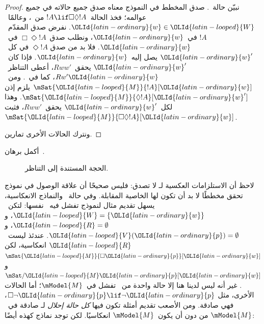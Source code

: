 \documentclass[../../../include/open-logic-section]{subfiles}
\begin{document}
\begin{proof}
  نبيّن حالة~. صدق المخطط في النموذج معناه صدق جميع
  حالاته في جميع عوالمه؛ فخذ الحالة~$!A \lif \Box\Diamond !A$
  من~، وعالمًا~${\OLId{latin-ordinary}{w}} \in {\OLId{latin-looped}{W}}$. نفرض صدق المقدّم~$!A$ في~${\OLId{latin-ordinary}{w}}$،
  ونطلب صدق~$\Box \Diamond !A$ في~${\OLId{latin-ordinary}{w}}$. فلا بد من صدق
  $\Diamond !A$ في كل~${\OLId{latin-ordinary}{w}}'$ يصل إليه~${\OLId{latin-ordinary}{w}}$.
  فإذا كان~${\OLId{latin-ordinary}{w}}'$ يحقق~$Rww'$، أعطى التناظر~$Rw'{\OLId{latin-ordinary}{w}}$، كما
  في~. ومن~$\mSat{{\OLId{latin-looped}{M}}}{!A}[{\OLId{latin-ordinary}{w}}]$ يلزم إذن
  $\mSat{{\OLId{latin-looped}{M}}}{\Diamond !A}[{\OLId{latin-ordinary}{w}}']$. وهذا لكل~${\OLId{latin-ordinary}{w}}'$ يحقق~$Rww'$،
  فثبت~$\mSat{{\OLId{latin-looped}{M}}}{\Box\Diamond!A}[{\OLId{latin-ordinary}{w}}]$.

  ونترك الحالات الأخرى تمارين.
\end{proof}

\begin{prob}
  أكمل برهان~.
\end{prob}

\begin{figure}
  \begin{center}
  \end{center}
\caption{الحجة المستندة إلى التناظر.}
\end{figure}

لاحظ أن الاستلزامات العكسية لـ لا تصدق: فليس
صحيحًا أن علاقة الوصول في نموذج تحقق مخططًا لا بد أن تكون لها الخاصية
المقابلة. وفي حالة~ والنماذج الانعكاسية، يسهل تقديم مثال لنموذج
تفشل فيه~ نفسها: لتكن~${\OLId{latin-looped}{W}} = \{{\OLId{latin-ordinary}{w}}\}$، و${\OLId{latin-looped}{R}} = \emptyset$، و
${\OLId{latin-looped}{V}}({\OLId{latin-ordinary}{p}}) = \emptyset$. عندئذ ليست~${\OLId{latin-looped}{R}}$ انعكاسية، لكن
$\mSat{{\OLId{latin-looped}{M}}}{\Box {\OLId{latin-ordinary}{p}}}[{\OLId{latin-ordinary}{w}}]$ و$\mSat/{{\OLId{latin-looped}{M}}}{{\OLId{latin-ordinary}{p}}}[{\OLId{latin-ordinary}{w}}]$. غير أنه ليس لدينا هنا إلا
حالة واحدة من~ تفشل في~$\mModel{M}$؛ أما الحالات الأخرى، مثل
$\Box \lnot {\OLId{latin-ordinary}{p}} \lif \lnot {\OLId{latin-ordinary}{p}}$، فهي صادقة. ومن الأصعب تقديم أمثلة تكون
فيها \emph{كل حالة إحلال} لـ صادقة في~$\mModel{M}$ من دون أن
يكون~$\mModel{M}$ انعكاسيًا. لكن توجد نماذج كهذه أيضًا:
\end{document}
